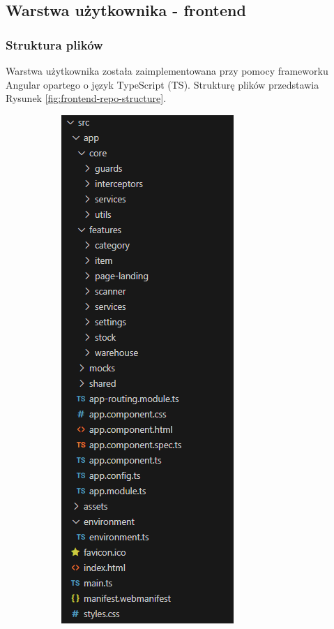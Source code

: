 \documentclass[../../main.tex]{subfiles}
\begin{document}
\subsection{Warstwa użytkownika - frontend}
    \subsubsection{Struktura plików}
        Warstwa użytkownika została zaimplementowana przy pomocy frameworku Angular\cite{angular} opartego o język TypeScript (TS). Strukturę plików przedstawia Rysunek \ref{fig:frontend-repo-structure}.

        \begin{figure}[ht!]
            \begin{subfigure}{.5\textwidth}
                \centering
                \includegraphics[height=0.4\pdfpageheight]{images/front-repo-structure.png}

\end{subfigure}
\end{figure}
\end{document}
